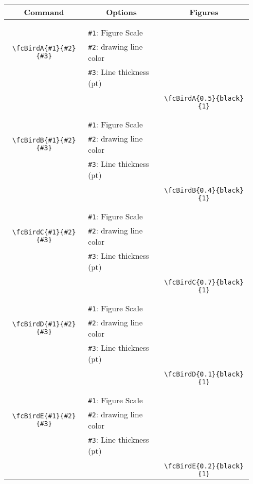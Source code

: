 \documentclass[x11names]{article}
\begin{document}
\begin{table}[H]\centering\begin{tabular}{|c|l|c|}\hline {\bf Command}& \multicolumn{1}{c|}{{\bf Options}} & {\bf Figures}\\  \hline	&&\multirow{5}{*}{\fcBirdA{0.5}{black}{1}}\\	&&\\	&\verb|#1|: Figure Scale &\\	\verb|\fcBirdA{#1}{#2}{#3}|&	\verb|#2|: drawing line color &\\	&\verb|#3|: Line thickness (pt) &\\ &&\\&&	\verb|\fcBirdA{0.5}{black}{1}|\\\hline 	
	&&\multirow{5}{*}{\fcBirdB{0.4}{black}{1}}\\	&&\\	&\verb|#1|: Figure Scale &\\	\verb|\fcBirdB{#1}{#2}{#3}|&	\verb|#2|: drawing line color &\\	&\verb|#3|: Line thickness (pt) &\\ &&\\&&	\verb|\fcBirdB{0.4}{black}{1}|\\\hline 	
	&&\multirow{5}{*}{\fcBirdC{0.7}{black}{1}}\\	&&\\	&\verb|#1|: Figure Scale &\\	\verb|\fcBirdC{#1}{#2}{#3}|&	\verb|#2|: drawing line color &\\	&\verb|#3|: Line thickness (pt) &\\ &&\\&&	\verb|\fcBirdC{0.7}{black}{1}|\\\hline 	
	&&\multirow{5}{*}{\fcBirdD{0.1}{black}{1}}\\	&&\\	&\verb|#1|: Figure Scale &\\	\verb|\fcBirdD{#1}{#2}{#3}|&	\verb|#2|: drawing line color &\\	&\verb|#3|: Line thickness (pt) &\\ &&\\&&	\verb|\fcBirdD{0.1}{black}{1}|\\\hline 	
	&&\multirow{5}{*}{\fcBirdE{0.2}{black}{1}}\\	&&\\	&\verb|#1|: Figure Scale &\\	\verb|\fcBirdE{#1}{#2}{#3}|&	\verb|#2|: drawing line color &\\	&\verb|#3|: Line thickness (pt) &\\ &&\\&&	\verb|\fcBirdE{0.2}{black}{1}|\\\hline 	

\end{tabular}
\end{table}
\end{document}
